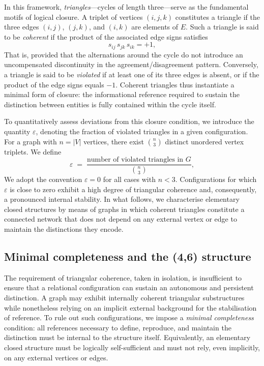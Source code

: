 \documentclass[11pt,a4paper]{article}
\begin{document}
In this framework, \emph{triangles}—cycles of length three—serve as the fundamental motifs of logical closure. A triplet of vertices \((i,j,k)\) constitutes a triangle if the three edges \((i,j)\), \((j,k)\), and \((i,k)\) are elements of \(E\). Such a triangle is said to be \emph{coherent} if the product of the associated edge signs satisfies
\[
  s_{ij}\,s_{jk}\,s_{ik} = +1,
\]
That is, provided that the alternations around the cycle do not introduce an uncompensated discontinuity in the agreement/disagreement pattern. Conversely, a triangle is said to be \emph{violated} if at least one of its three edges is absent, or if the product of the edge signs equals \(-1\). Coherent triangles thus instantiate a minimal form of closure: the informational reference required to sustain the distinction between entities is fully contained within the cycle itself.

To quantitatively assess deviations from this closure condition, we introduce the quantity \(\varepsilon\), denoting the fraction of violated triangles in a given configuration. For a graph with \(n = |V|\) vertices, there exist \( \binom{n}{3} \) distinct unordered vertex triplets. We define
\[
  \varepsilon \;=\; \frac{\text{number of violated triangles in } G}{\binom{n}{3}},
\]
We adopt the convention \(\varepsilon = 0\) for all cases with \(n < 3\). Configurations for which \(\varepsilon\) is close to zero exhibit a high degree of triangular coherence and, consequently, a pronounced internal stability. In what follows, we characterise elementary closed structures by means of graphs in which coherent triangles constitute a connected network that does not depend on any external vertex or edge to maintain the distinctions they encode.

\subsection{Minimal completeness and the (4,6) structure}

The requirement of triangular coherence, taken in isolation, is insufficient to ensure that a relational configuration can sustain an autonomous and persistent distinction. A graph may exhibit internally coherent triangular substructures while nonetheless relying on an implicit external background for the stabilisation of reference. To rule out such configurations, we impose a \emph{minimal completeness} condition: all references necessary to define, reproduce, and maintain the distinction must be internal to the structure itself. Equivalently, an elementary closed structure must be logically self-sufficient and must not rely, even implicitly, on any external vertices or edges.
\end{document}
